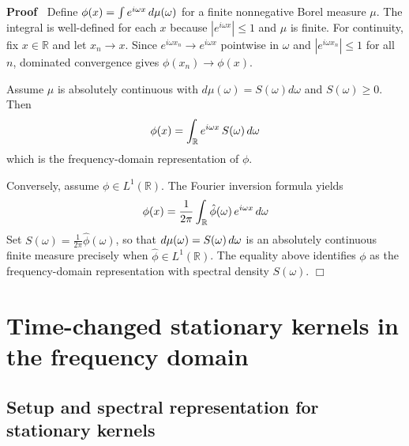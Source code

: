 \documentclass{article}
\newenvironment{proof}{\noindent\textbf{Proof\ }}{\hspace*{\fill}$\Box$\medskip}
{\theorembodyfont{\rmfamily}\newtheorem{example}{Example}}
\begin{document}
\begin{proof}
  Define $\phi (x) = \int e^{i \omega x}  \hspace{0.17em} d \mu (\omega)$ for
  a finite nonnegative Borel measure $\mu$. The integral is well-defined for
  each $x$ because $|e^{i \omega x} | \le 1$ and $\mu$ is finite. For
  continuity, fix $x \in \mathbb{R}$ and let $x_n \to x$. Since $e^{i \omega
  x_n} \to e^{i \omega x}$ pointwise in $\omega$ and $|e^{i \omega x_n} | \le
  1$ for all $n$, dominated convergence gives $\phi (x_n) \to \phi (x)$.
  
  Assume $\mu$ is absolutely continuous with $d \mu (\omega) = S (\omega) d
  \omega$ and $S (\omega) \ge 0$. Then
  \begin{equation}
    \phi (x) = \int_{\mathbb{R}} e^{i \omega x}  \hspace{0.17em} S (\omega) 
    \hspace{0.17em} d \omega
  \end{equation}
  which is the frequency-domain representation of $\phi$.
  
  Conversely, assume $\phi \in L^1 (\mathbb{R})$. The Fourier inversion
  formula yields
  \begin{equation}
    \phi (x) = \frac{1}{2 \pi}  \int_{\mathbb{R}} \hat{\phi} (\omega) 
    \hspace{0.17em} e^{i \omega x}  \hspace{0.17em} d \omega
  \end{equation}
  Set $S (\omega) = \frac{1}{2 \pi}  \hat{\phi} (\omega)$, so that $d \mu
  (\omega) = S (\omega)  \hspace{0.17em} d \omega$ is an absolutely continuous
  finite measure precisely when $\hat{\phi} \in L^1 (\mathbb{R})$. The
  equality above identifies $\phi$ as the frequency-domain representation with
  spectral density $S (\omega)$.
\end{proof}

\section{Time-changed stationary kernels in the frequency domain}

\subsection{Setup and spectral representation for stationary kernels}
\end{document}
